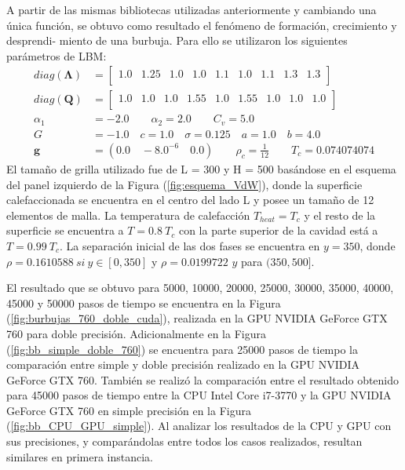A partir de las mismas bibliotecas utilizadas anteriormente y cambiando una única función, se obtuvo como resultado el fenómeno de formación, crecimiento y desprendi- miento de una burbuja. Para ello se utilizaron los siguientes parámetros de LBM:
{\footnotesize \begin{align*}
diag(\mathbf{\Lambda}) & = 
\begin{bmatrix}
1.0 & 1.25 & 1.0 & 1.0 & 1.1 & 1.0 & 1.1 & 1.3 & 1.3 \\
\end{bmatrix}\\
diag(\mathbf{Q}) & = 
\begin{bmatrix}
1.0 & 1.0 & 1.0 & 1.55 & 1.0 & 1.55 & 1.0 & 1.0 & 1.0 \\
\end{bmatrix}\\
\alpha_{1} & = -2.0 \qquad 	\alpha_{2} = 2.0 \qquad C_{v} = 5.0\\
G & = -1.0 \quad c = 1.0 \quad \sigma = 0.125 \quad a = 1.0 \quad b = 4.0 \\
\mathbf{g} & = (0.0 \quad -8.0^{-6} \quad 0.0 ) \qquad \rho_c = \frac{1}{12} \qquad T_c = 0.074074074
\end{align*}}
El tamaño de grilla utilizado fue de L = 300 y H = 500 basándose en el esquema del panel izquierdo de la Figura (\ref{fig:esquema_VdW}), donde la superficie calefaccionada se encuentra en el centro del lado L y posee un tamaño de 12 elementos de malla. La temperatura de calefacción $T_{heat} = T_c$  y el resto de la superficie se encuentra a $T = 0.8 \> T_c$ con la parte superior de la cavidad está a $T = 0.99 \> T_c$. La separación inicial de las dos fases se encuentra en $y = 350$, donde $\rho = 0.1610588 \> si \> y \in [0,350]$ y $\rho = 0.0199722$ $y$ para $(350,500]$.

El resultado que se obtuvo para 5000, 10000, 20000, 25000, 30000, 35000, 40000, 45000 y 50000 pasos de tiempo se encuentra en la Figura (\ref{fig:burbujas_760_doble_cuda}), realizada en la GPU NVIDIA GeForce GTX 760 para doble precisión. Adicionalmente en la Figura (\ref{fig:bb_simple_doble_760}) se encuentra para 25000 pasos de tiempo la comparación entre simple y doble precisión realizado en la GPU NVIDIA GeForce GTX 760. También se realizó la comparación entre el resultado obtenido para 45000 pasos de tiempo entre la CPU Intel Core i7-3770 y la GPU NVIDIA GeForce GTX 760 en simple precisión  en la Figura (\ref{fig:bb_CPU_GPU_simple}). Al analizar los resultados de la CPU y GPU con sus precisiones, y comparándolas entre todos los casos realizados, resultan similares en primera instancia.

